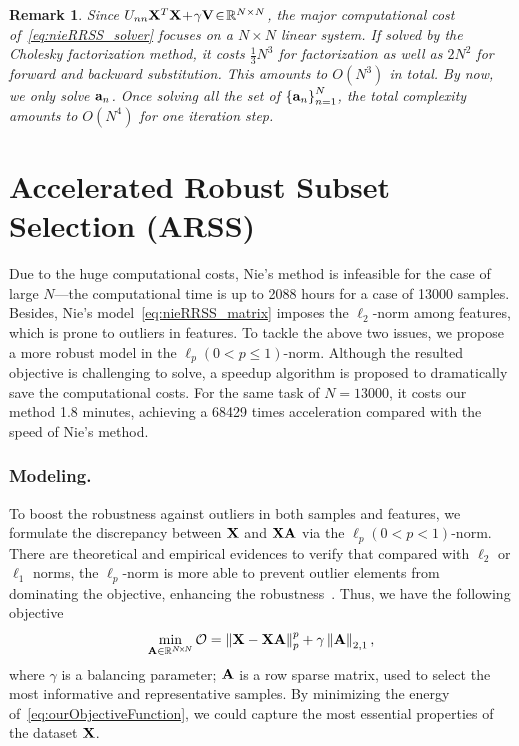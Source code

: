 \documentclass[a4paper]{article}
\newtheorem{remark}[theorem]{Remark}     %
\begin{document}
\begin{remark}\label{remark:RRSSnie_computationalComplexity} Since
$U_{nn}\mathbf{X}^{T}\mathbf{X}\!+\!\gamma\mathbf{V}\!\in\!\mathbb{R}^{N\times N}$,
the major computational cost of\ \eqref{eq:nieRRSS_solver} focuses
on a $N\times N$  linear system. If solved by the Cholesky factorization
method, it costs $\frac{1}{3}N^{3}$ for factorization as well as
$2N^{2}$ for forward and backward substitution. This amounts to $O\left(N^{3}\right)$
in total. By now, we only solve $\mathbf{a}_{n}$. Once solving all the
set of $\left\{ \mathbf{a}_{n}\right\} _{n=1}^{N}$, the total complexity
amounts to $O\left(\! N^{4}\!\right)$ for one iteration step. \end{remark}


\section{Accelerated Robust Subset Selection (ARSS)}

Due to the huge computational costs, Nie's method is infeasible for
the case of large $N$---the computational time is up to 2088 hours
for a case of 13000 samples. Besides, Nie's model\ \eqref{eq:nieRRSS_matrix}
imposes the $\ell_{2}$-norm among features, which is prone to outliers
in features. To tackle the above two issues, we propose a more robust
model in the $\ell_{p}\left(0<p\leq1\right)$-norm. Although the resulted
objective is challenging to solve,  a speedup algorithm is proposed
to dramatically save the computational costs. For the same task of
$N=13000$, it costs our method 1.8 minutes, achieving a 68429 times
acceleration compared with the speed of Nie's method. 


\subsubsection{Modeling. }

To boost the robustness against outliers in both samples and features,
we formulate the discrepancy between $\mathbf{X}$ and $\mathbf{X}\mathbf{A}$
via the $\ell_{p}\!\left(0\!<\! p\!<\!1\right)$-norm. There are theoretical
and empirical evidences to verify that compared with $\ell_{2}$ or
$\ell_{1}$ norms, the $\ell_{\! p}$-norm is more able to prevent
outlier elements from dominating the objective, enhancing the robustness\ \cite{fpNie_2012_ICDM_robustMatrixCompletion}.
Thus, we have the following objective
\begin{equation}
\min_{\mathbf{A}\in\mathbb{R}^{N\!\times\! N}}\mathcal{O}=\left\Vert \mathbf{X}-\mathbf{X}\mathbf{A}\right\Vert _{p}^{p}+\gamma\left\Vert \mathbf{A}\right\Vert _{2,1},\label{eq:ourObjectiveFunction}
\end{equation}
where $\gamma$ is a balancing parameter; $\mathbf{A}$ is a row sparse
matrix, used to select the most informative and representative samples.
By minimizing the energy of\ \eqref{eq:ourObjectiveFunction}, we
could capture the most essential properties of the dataset $\mathbf{X}$. 
\end{document}
